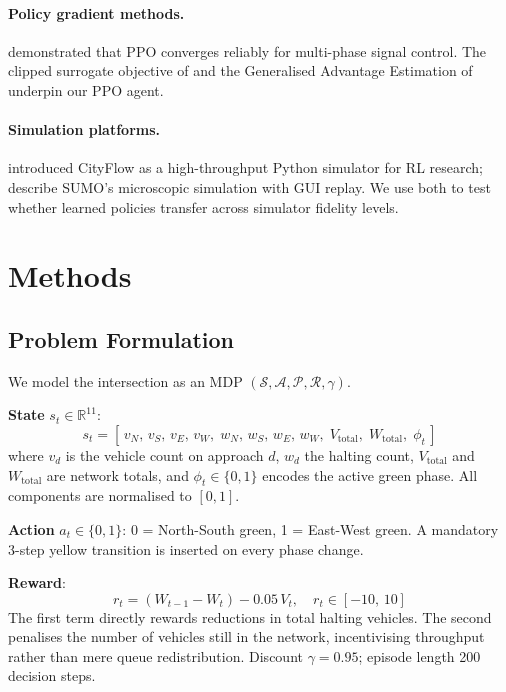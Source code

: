\documentclass[twoside,11pt]{article}
\begin{document}
\paragraph{Policy gradient methods.}
\citet{liang2019deep} demonstrated that PPO converges reliably for multi-phase
signal control.  The clipped surrogate objective of \citet{schulman2017proximal}
and the Generalised Advantage Estimation of \citet{schulman2015high} underpin
our PPO agent.

\paragraph{Simulation platforms.}
\citet{zhang2019cityflow} introduced CityFlow as a high-throughput Python
simulator for RL research; \citet{behrisch2011sumo} describe SUMO's
microscopic simulation with GUI replay.  We use both to test whether learned
policies transfer across simulator fidelity levels.

\section{Methods}

\subsection{Problem Formulation}

We model the intersection as an MDP
$(\mathcal{S}, \mathcal{A}, \mathcal{P}, \mathcal{R}, \gamma)$.

\textbf{State} $s_t \in \mathbb{R}^{11}$:
\begin{equation}
s_t = [\,v_N,\, v_S,\, v_E,\, v_W,\;
        w_N,\, w_S,\, w_E,\, w_W,\;
        V_{\text{total}},\; W_{\text{total}},\; \phi_t\,]
\end{equation}
where $v_d$ is the vehicle count on approach $d$, $w_d$ the halting count,
$V_{\text{total}}$ and $W_{\text{total}}$ are network totals, and
$\phi_t \in \{0,1\}$ encodes the active green phase.
All components are normalised to $[0,1]$.

\textbf{Action} $a_t \in \{0, 1\}$: 0 = North-South green, 1 = East-West green.
A mandatory 3-step yellow transition is inserted on every phase change.

\textbf{Reward}:
\begin{equation}
r_t = (W_{t-1} - W_t) - 0.05\,V_t, \quad r_t \in [-10,\,10]
\label{eq:reward}
\end{equation}
The first term directly rewards reductions in total halting vehicles.
The second penalises the number of vehicles still in the network, incentivising
throughput rather than mere queue redistribution.
Discount $\gamma = 0.95$; episode length 200 decision steps.
\end{document}
